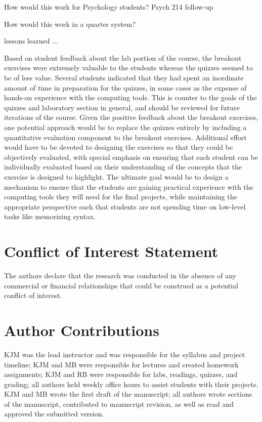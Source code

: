 How would this work for Psychology students?  Psych 214 follow-up

How would this work in a quarter system?

lessons learned ...

Based on student feedback about the lab portion of the course, the breakout
exercises were extremely valuable to the students whereas the quizzes seemed
to be of less value.
Several students indicated that they had spent an inordinate amount of time in
preparation for the quizzes, in some cases as the expense of hands-on
experience with the computing tools.
This is counter to the goals of the quizzes and laboratory section in general,
and should be reviewed for future iterations of the course.
Given the positive feedback about the breakout exercises, one potential 
approach would be to replace the quizzes entirely by including a quantitative
evaluation component to the breakout exercises.
Additional effort would have to be devoted to designing the exercises so that
they could be objectively evaluated, with special emphasis on ensuring that
each student can be individually evaluated based on their understanding of the
concepts that the exercise is designed to highlight.
The ultimate goal would be to design a mechanism to ensure that the students
are gaining practical experience with the computing tools they will need for 
the final projects, while maintaining the appropriate perspective such that
students are not spending time on low-level tasks like memorizing syntax.


\section*{Conflict of Interest Statement}

The authors declare that the research was conducted in the absence of any commercial or financial relationships that could be construed as a potential conflict of interest.

\section*{Author Contributions}

KJM was the lead instructor and was responsible for the syllabus and project timeline;
KJM and MB were responsible for lectures and created homework assignments;
KJM and RB were responsible for labs, readings, quizzes, and grading;
all authors held weekly office hours to assist students with their projects.
KJM and MB wrote the first draft of the manuscript;
all authors wrote sections of the manuscript, contributed to manuscript revision, 
as well as read and approved the submitted version.
